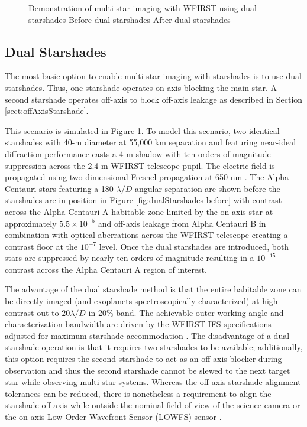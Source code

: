 \documentclass[]{spie}  %
\begin{document}
\begin{figure}[t!]
\centering
{}
\caption[Companion Leakage]
{\label{fig:dualStarshades} Demonstration of multi-star imaging with WFIRST using dual starshades  Before dual-starshades  After dual-starshades}
\end{figure}


\subsection{Dual Starshades}

The most basic option to enable multi-star imaging with starshades is to use dual starshades. Thus, one starshade operates on-axis blocking the main star. A second starshade operates off-axis to block off-axis leakage as described in Section \ref{sect:offAxisStarshade}.

This scenario is simulated in Figure \ref{fig:dualStarshades}. To model this scenario, two identical starshades with 40-m diameter at 55,000 km separation and featuring near-ideal diffraction performance casts a 4-m shadow with ten orders of magnitude suppression across the 2.4 m WFIRST telescope pupil. The electric field is propagated using two-dimensional Fresnel propagation at 650 nm \cite{Sirbu16AO}. The Alpha Centauri stars featuring a 180 $\lambda/D$ angular separation are shown before the starshades are in position in Figure \ref{fig:dualStarshades-before} with contrast across the Alpha Centauri A habitable  zone limited by the on-axis star at approximately $5.5 \times 10^{-5}$ and off-axis leakage from Alpha Centauri B in combination with optical aberrations across the WFIRST telescope creating a contrast floor at the $10^{-7}$ level. Once the dual starshades are introduced, both stars are suppressed by nearly ten orders of magnitude resulting in a $10^{-15}$ contrast across the Alpha Centauri A region of interest. 

The advantage of the dual starshade method is that the entire habitable zone can be directly imaged (and exoplanets spectroscopically characterized) at high-contrast out to $20 \lambda/D$ in 20\% band. The achievable outer working angle and characterization bandwidth are driven by the WFIRST IFS specifications adjusted for maximum starshade accommodation \cite{Mandell17}. The disadvantage of a dual starshade operation is that it requires two starshades to be available; additionally, this option requires the second starshade to act as an off-axis blocker during observation and thus the second starshade cannot be slewed to the next target star while observing multi-star systems. Whereas the off-axis starshade alignment tolerances can be reduced, there is nonetheless a requirement to align the starshade off-axis while outside the nominal field of view of the science camera or the on-axis Low-Order Wavefront Sensor (LOWFS) sensor \cite{Bottom17}.
\end{document}
